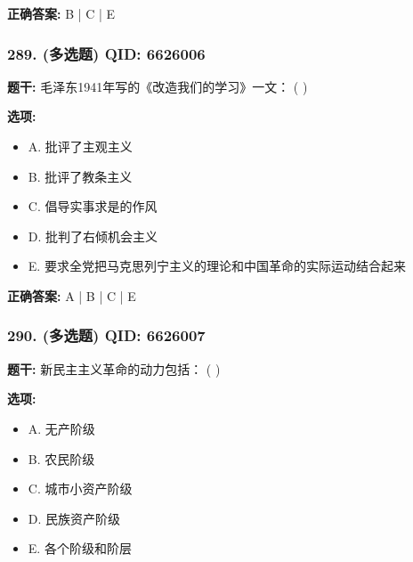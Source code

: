\documentclass[12pt,UTF8]{ctexart}
\begin{document}
\textbf{正确答案:}
B | C | E

\vspace{0.3em}\hrulefill\vspace{0.7em}

\subsubsection*{289. (多选题) \small QID: 6626006}

\textbf{题干:}
毛泽东1941年写的《改造我们的学习》一文： ( )

\textbf{选项:}
\begin{itemize}[leftmargin=*]

  \item A. 批评了主观主义

  \item B. 批评了教条主义

  \item C. 倡导实事求是的作风

  \item D. 批判了右倾机会主义

  \item E. 要求全党把马克思列宁主义的理论和中国革命的实际运动结合起来

\end{itemize}

\textbf{正确答案:}
A | B | C | E

\vspace{0.3em}\hrulefill\vspace{0.7em}

\subsubsection*{290. (多选题) \small QID: 6626007}

\textbf{题干:}
新民主主义革命的动力包括： ( )

\textbf{选项:}
\begin{itemize}[leftmargin=*]

  \item A. 无产阶级

  \item B. 农民阶级

  \item C. 城市小资产阶级

  \item D. 民族资产阶级

  \item E. 各个阶级和阶层

\end{itemize}
\end{document}
